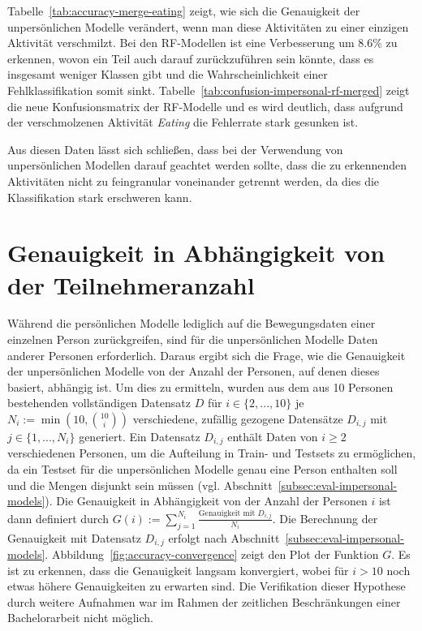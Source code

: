 Tabelle~\ref{tab:accuracy-merge-eating} zeigt, wie sich die Genauigkeit der unpersönlichen Modelle verändert, wenn man diese Aktivitäten zu einer einzigen Aktivität verschmilzt. Bei den RF-Modellen ist eine Verbesserung um $8.6 \%$ zu erkennen, wovon ein Teil auch darauf zurückzuführen sein könnte, dass es insgesamt weniger Klassen gibt und die Wahrscheinlichkeit einer Fehlklassifikation somit sinkt. Tabelle~\ref{tab:confusion-impersonal-rf-merged} zeigt die neue Konfusionsmatrix der RF-Modelle und es wird deutlich, dass aufgrund der verschmolzenen Aktivität \textit{Eating} die Fehlerrate stark gesunken ist.

Aus diesen Daten lässt sich schließen, dass bei der Verwendung von unpersönlichen Modellen darauf geachtet werden sollte, dass die zu erkennenden Aktivitäten nicht zu feingranular voneinander getrennt werden, da dies die Klassifikation stark erschweren kann.

\section{Genauigkeit in Abhängigkeit von der Teilnehmeranzahl}
Während die persönlichen Modelle lediglich auf die Bewegungsdaten einer einzelnen Person zurückgreifen, sind für die unpersönlichen Modelle Daten anderer Personen erforderlich. Daraus ergibt sich die Frage, wie die Genauigkeit der unpersönlichen Modelle von der Anzahl der Personen, auf denen dieses basiert, abhängig ist. Um dies zu ermitteln, wurden aus dem aus 10 Personen bestehenden vollständigen Datensatz $D$ für $i \in \{2, ..., 10\}$ je $N_i := \min(10, \binom{10}{i})$ verschiedene, zufällig gezogene Datensätze $D_{i,j}$ mit $j \in \{1, ..., N_i\}$ generiert. Ein Datensatz $D_{i,j}$ enthält Daten von $i \geq 2$ verschiedenen Personen, um die Aufteilung in Train- und Testsets zu ermöglichen, da ein Testset für die unpersönlichen Modelle genau eine Person enthalten soll und die Mengen disjunkt sein müssen (vgl. Abschnitt~\ref{subsec:eval-impersonal-models}). Die Genauigkeit in Abhängigkeit von der Anzahl der Personen $i$ ist dann definiert durch $G(i) := \sum_{j=1}^{N_i} \frac{\text{Genauigkeit mit } D_{i,j}}{N_i}$. Die Berechnung der Genauigkeit mit Datensatz $D_{i,j}$ erfolgt nach Abschnitt~\ref{subsec:eval-impersonal-models}.
Abbildung~\ref{fig:accuracy-convergence} zeigt den Plot der Funktion $G$. Es ist zu erkennen, dass die Genauigkeit langsam konvergiert, wobei für $i > 10$ noch etwas höhere Genauigkeiten zu erwarten sind. Die Verifikation dieser Hypothese durch weitere Aufnahmen war im Rahmen der zeitlichen Beschränkungen einer Bachelorarbeit nicht möglich.

